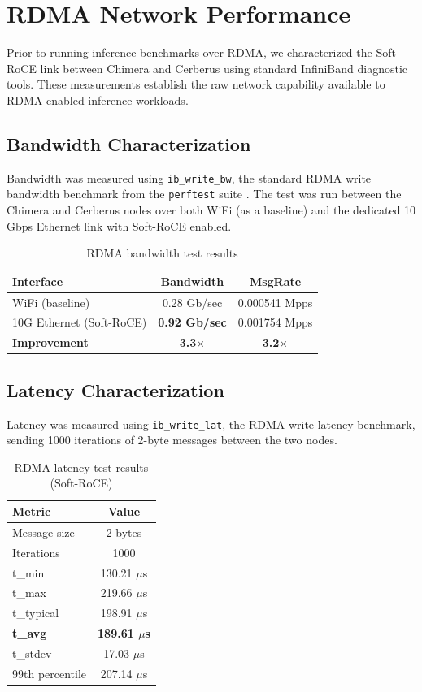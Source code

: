 \documentclass[10pt,letterpaper]{article}
\begin{document}
\section{RDMA Network Performance}

Prior to running inference benchmarks over RDMA, we characterized the Soft-RoCE link between Chimera and Cerberus using standard InfiniBand diagnostic tools. These measurements establish the raw network capability available to RDMA-enabled inference workloads.

\subsection{Bandwidth Characterization}

Bandwidth was measured using \texttt{ib\_write\_bw}, the standard RDMA write bandwidth benchmark from the \texttt{perftest} suite \cite{rdma-core}. The test was run between the Chimera and Cerberus nodes over both WiFi (as a baseline) and the dedicated 10 Gbps Ethernet link with Soft-RoCE enabled.

\begin{table}[H]
\centering
\small
\begin{tabular}{@{}lcc@{}}
\toprule
\textbf{Interface} & \textbf{Bandwidth} & \textbf{MsgRate} \\
\midrule
WiFi (baseline) & 0.28 Gb/sec & 0.000541 Mpps \\
10G Ethernet (Soft-RoCE) & \textbf{0.92 Gb/sec} & 0.001754 Mpps \\
\midrule
\textbf{Improvement} & \textbf{3.3$\times$} & \textbf{3.2$\times$} \\
\bottomrule
\end{tabular}
\caption{RDMA bandwidth test results}
\end{table}

\subsection{Latency Characterization}

Latency was measured using \texttt{ib\_write\_lat}, the RDMA write latency benchmark, sending 1000 iterations of 2-byte messages between the two nodes.

\begin{table}[H]
\centering
\small
\begin{tabular}{@{}lc@{}}
\toprule
\textbf{Metric} & \textbf{Value} \\
\midrule
Message size & 2 bytes \\
Iterations & 1000 \\
t\_min & 130.21 $\mu$s \\
t\_max & 219.66 $\mu$s \\
t\_typical & 198.91 $\mu$s \\
\textbf{t\_avg} & \textbf{189.61 $\mu$s} \\
t\_stdev & 17.03 $\mu$s \\
99th percentile & 207.14 $\mu$s \\
\bottomrule
\end{tabular}
\caption{RDMA latency test results (Soft-RoCE)}
\end{table}
\end{document}
